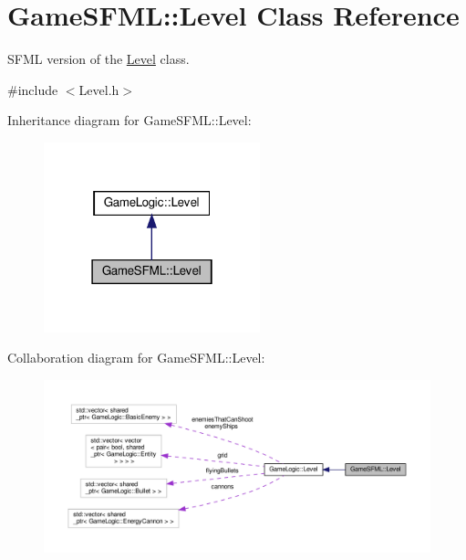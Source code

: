 \hypertarget{classGameSFML_1_1Level}{}\section{Game\+S\+F\+ML\+:\+:Level Class Reference}
\label{classGameSFML_1_1Level}


S\+F\+ML version of the \hyperlink{classGameSFML_1_1Level}{Level} class.  




{\ttfamily \#include $<$Level.\+h$>$}



Inheritance diagram for Game\+S\+F\+ML\+:\+:Level\+:
\nopagebreak
\begin{figure}[H]
\begin{center}
\leavevmode
\includegraphics[width=178pt]{classGameSFML_1_1Level__inherit__graph}
\end{center}
\end{figure}


Collaboration diagram for Game\+S\+F\+ML\+:\+:Level\+:
\nopagebreak
\begin{figure}[H]
\begin{center}
\leavevmode
\includegraphics[width=350pt]{classGameSFML_1_1Level__coll__graph}
\end{center}
\end{figure}
